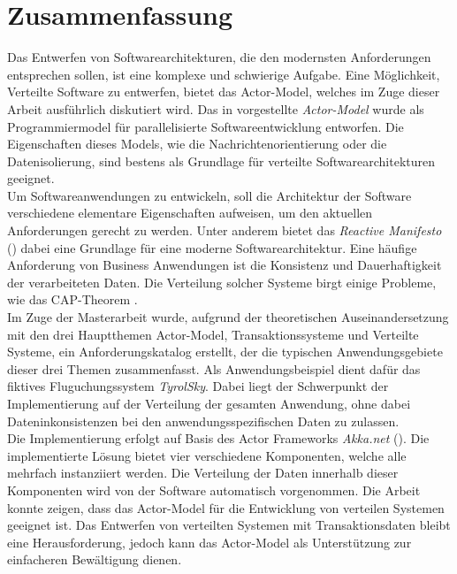 \chapter*{Zusammenfassung}
Das Entwerfen von Softwarearchitekturen, die den modernsten Anforderungen entsprechen sollen, ist eine komplexe und schwierige Aufgabe. Eine Möglichkeit, Verteilte Software zu entwerfen, bietet das  Actor-Model, welches im Zuge dieser Arbeit ausführlich diskutiert wird. Das in \cite{Hewitt1973AIntelligence} vorgestellte \textit{Actor-Model} wurde als Programmiermodel für parallelisierte Softwareentwicklung entworfen. Die Eigenschaften dieses Models, wie die Nachrichtenorientierung oder die Datenisolierung, sind bestens als Grundlage für verteilte Softwarearchitekturen geeignet. \\
Um Softwareanwendungen zu entwickeln, soll die Architektur der Software verschiedene elementare Eigenschaften aufweisen, um den aktuellen Anforderungen gerecht zu werden. Unter anderem bietet das \textit{Reactive Manifesto} (\cite{reactiveManifesto}) dabei eine Grundlage für eine moderne Softwarearchitektur. 
Eine häufige Anforderung von Business Anwendungen ist die Konsistenz und Dauerhaftigkeit der verarbeiteten Daten. Die Verteilung solcher Systeme birgt einige Probleme, wie das CAP-Theorem \citep{gilbertPerspectiveCAPTheorem2012}. \\
Im Zuge der Masterarbeit wurde, aufgrund der theoretischen Auseinandersetzung mit den drei Hauptthemen  Actor-Model, Transaktionssysteme und Verteilte Systeme, ein Anforderungskatalog erstellt, der die typischen Anwendungsgebiete dieser drei Themen zusammenfasst. Als Anwendungsbeispiel dient dafür das fiktives Fluguchungssystem \textit{TyrolSky}. Dabei liegt der Schwerpunkt der Implementierung auf der Verteilung der gesamten Anwendung, ohne dabei Dateninkonsistenzen bei den anwendungsspezifischen Daten zu zulassen. \\
Die Implementierung erfolgt auf Basis des Actor Frameworks \textit{Akka.net} (\cite{Akka.netCommunityAkka.NETDocumentation}). Die implementierte Lösung bietet vier verschiedene Komponenten, welche alle mehrfach instanziiert werden. Die Verteilung der Daten innerhalb dieser Komponenten wird von der Software automatisch vorgenommen.
Die Arbeit konnte zeigen, dass das Actor-Model für die Entwicklung von verteilen Systemen geeignet ist. Das Entwerfen von verteilten Systemen mit Transaktionsdaten bleibt eine Herausforderung, jedoch kann das Actor-Model als Unterstützung zur einfacheren Bewältigung dienen.

\cleardoublepage
